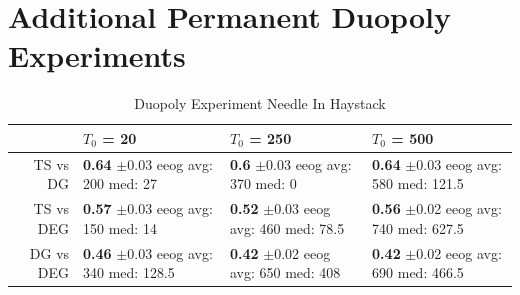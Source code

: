 \documentclass[11pt,letterpaper]{article}
\begin{document}
\section{Additional Permanent Duopoly Experiments}
\begin{table}[H]
\centering
\caption{Duopoly Experiment Needle In Haystack} 
\begin{tabular}{rlll}
  \hline
 & $T_0$ = 20 & $T_0$ = 250 & $T_0$ = 500 \\ 
  \hline
TS vs DG & \makecell{\textbf{0.64} $\pm$0.03\\ eeog \\ avg: 200\\ med: 27} & \makecell{\textbf{0.6} $\pm$0.03\\ eeog \\ avg: 370\\ med: 0} & \makecell{\textbf{0.64} $\pm$0.03\\ eeog \\ avg: 580\\ med: 121.5} \\ 
  TS vs DEG & \makecell{\textbf{0.57} $\pm$0.03\\ eeog \\ avg: 150\\ med: 14} & \makecell{\textbf{0.52} $\pm$0.03\\ eeog \\ avg: 460\\ med: 78.5} & \makecell{\textbf{0.56} $\pm$0.02\\ eeog \\ avg: 740\\ med: 627.5} \\ 
  DG vs DEG & \makecell{\textbf{0.46} $\pm$0.03\\ eeog \\ avg: 340\\ med: 128.5} & \makecell{\textbf{0.42} $\pm$0.02\\ eeog \\ avg: 650\\ med: 408} & \makecell{\textbf{0.42} $\pm$0.02\\ eeog \\ avg: 690\\ med: 466.5} \\ 
   \hline
\end{tabular}
\end{table}
\end{document}
